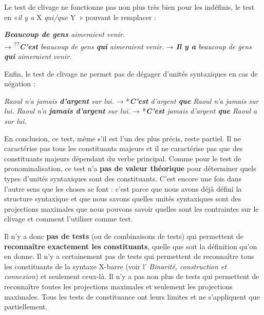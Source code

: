{    Le test de clivage ne fonctionne pas non plus très bien pour les indéfinis, le test en «\textit{il y a} X \textit{qui/que} Y~» pouvant le remplacer :

    \ea
        \textit{\textbf{{Beaucoup de gens}}  {aimeraient venir.}}\\     
        \textrm{→}    \textsuperscript{??}\textit{\textbf{{C’est}}  {beaucoup de gens} \textbf{{qui}}  {aimeraient venir.}}
        \textrm{→}    \textit{\textbf{{Il y a}}  {beaucoup de gens} \textbf{{qui}}  {aimeraient venir.}}\\
    \z

    Enfin, le test de clivage ne permet pas de dégager d’unités syntaxiques en cas de négation :

    \ea
    \ea         \textit{{Raoul n’a}  {jamais} \textbf{{d’argent}} {sur lui.}} \textrm{→}  *\textit{\textbf{{C’est}} {d’argent} \textbf{{que}}  {Raoul n’a} {jamais sur lui.}}
    \ex         \textit{{Raoul n’a} \textbf{{jamais d’argent}}  {sur lui.}} \textrm{→}  *\textit{\textbf{{C’est}} {jamais d’argent} \textbf{{que}}  {Raoul a sur lui.}}
    \z
    \z

    En conclusion, ce test, même s’il est l’un des plus précis, reste partiel. Il ne caractérise pas tous les constituants majeurs et il ne caractérise pas que des constituants majeurs dépendant du verbe principal. Comme pour le test de pronominalisation, ce test n’a \textbf{pas de valeur théorique} pour déterminer quels types d’unités syntaxiques sont des constituants. C’est encore une fois dans l’autre sens que les choses se font : c’est parce que nous avons déjà défini la structure syntaxique et que nous savons quelles unités syntaxiques sont des projections maximales que nous pouvons savoir quelles sont les contraintes sur le clivage et comment l’utiliser comme test.

    Il n’y a donc \textbf{pas de tests} (ou de combinaisons de tests) qui permettent de \textbf{reconnaître exactement les constituants}, quelle que soit la définition qu’on en donne. Il n’y a certainement pas de tests qui permettent de reconnaître tous les constituants de la syntaxe X-barre (voir l' \textit{Binarité, construction et connexion}) et seulement ceux-là. Il n’y a pas non plus de tests qui permettent de reconnaître toutes les projections maximales et seulement les projections maximales. Tous les tests de constituance ont leurs limites et ne s’appliquent que partiellement.

}
